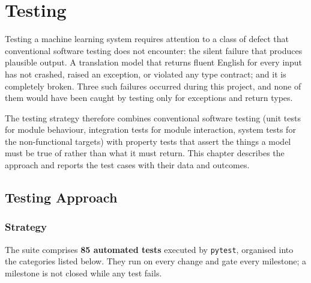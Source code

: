 \chapter{Testing}
\label{ch:testing}

Testing a machine learning system requires attention to a class of defect that
conventional software testing does not encounter: the silent failure that
produces plausible output. A translation model that returns fluent English for
every input has not crashed, raised an exception, or violated any type contract; and it is completely broken. Three such failures occurred during this
project, and none of them would have been caught by testing only for exceptions
and return types.

The testing strategy therefore combines conventional software testing (unit
tests for module behaviour, integration tests for module interaction, system
tests for the non-functional targets) with property tests that assert the
things a model must be true of rather than what it must return. This chapter
describes the approach and reports the test cases with their data and outcomes.

\section{Testing Approach}
\label{sec:testapproach}

\subsection{Strategy}
\label{subsec:teststrategy}

The suite comprises \textbf{85 automated tests} executed by \texttt{pytest},
organised into the categories listed below. They run on
every change and gate every milestone; a milestone is not closed while any test
fails.

